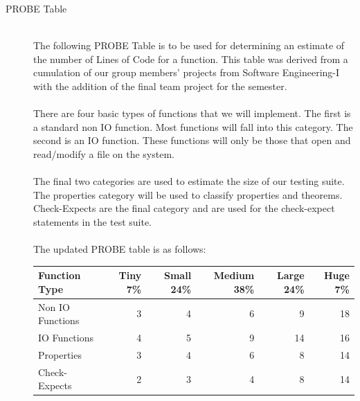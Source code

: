 \documentclass[11pt, letterpaper]{report}
\begin{document}
\begin{description}
\newpage
\hypertarget{P} {}
\item[PROBE Table] \hfill \\ 
The following PROBE Table is to be used for determining an estimate of the number of Lines of Code for a function.  This table was derived from a cumulation of our group members' projects from Software Engineering-I with the addition of the final team project for the semester. \\ \\
There are four basic types of functions that we will implement. The first is a standard non IO function. Most functions will fall into this category. The second is an IO function. These functions will only be those that open and read/modify a file on the system. \\ \\
The final two categories are used to estimate the size of our testing suite. The properties category will be used to classify properties and theorems. Check-Expects are the final category and are used for the check-expect statements in the test suite.\\ \\
The updated PROBE table is as follows:
\begin{table}[htdp]
\begin{center}
\begin{tabular}{lrrrrr}
Function Type & Tiny 7\% & Small 24\% & Medium 38\% & Large 24\% & Huge 7\% \\
\hline
Non IO Functions & 3 & 4 & 6 & 9 & 18 \\
IO Functions & 4 & 5 & 9 & 14 & 16\\
Properties & 3 & 4 & 6 & 8 & 14 \\
Check-Expects & 2 & 3 & 4 & 8 & 14\\
\hline
\end{tabular}
\end{center} 
\end{table}%


\end{description}
\end{document}
